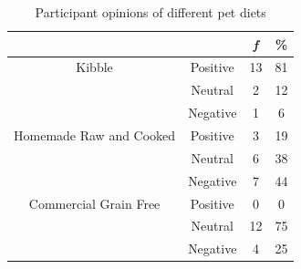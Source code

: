 \begin{table}[h!]
    \centering
    \caption{Participant opinions of different pet diets}
    \label{tab:my_label2}
    \begin{tabular}{c|c|cc}
    \hline
            &      &  \textit{f} & \% \\ \hline
    Kibble  &   Positive    &   13  &   81  \\
            &   Neutral     &   2   &   12  \\
            &   Negative    &   1   &   6   \\  \hline
    Homemade Raw and Cooked &   Positive    &   3   &   19  \\
            &   Neutral     &   6   &   38  \\
            &   Negative    &   7   &   44  \\  \hline
    Commercial Grain Free   &   Positive    &   0   &   0   \\
            &   Neutral     &   12  &   75  \\
            &   Negative    &   4   &   25  \\  \hline
  \end{tabular}
\end{table}        

